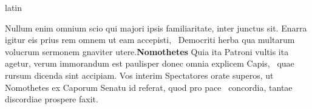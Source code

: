 \documentclass[12pt]{book}
\renewenvironment{latin}
    	{\begin{hyphenrules}{latin}}
    	{\end{hyphenrules}}
\begin{document}
\begin{pages}
\begin{latin}
\begin{Leftside}
                    Nullum enim omnium scio qui majori ipsis familiaritate, inter  junctus sit. 
                    Enarra igitur eis prius rem omnem ut eam accepisti, ﻿\ampersand\ Democriti herba qua multarum volucrum sermonem  gnaviter utere.\pend\pstart\textbf{Nomothetes }\hspace{1cm} Quia ita Patroni vultis ita agetur, verum immorandum est paulisper donec omnia explicem Capis, ﻿\ampersand\ quae rursum dicenda sint accipiam. 
                    Vos interim Spectatores orate superos, ut Nomothetes  ex Caporum Senatu id referat, 
                    quod pro pace ﻿\ampersand\ concordia, tantae discordiae prospere faxit.\pend 
        \endnumbering
        \end{Leftside}
        \end{latin}


\end{pages}
\end{document}

